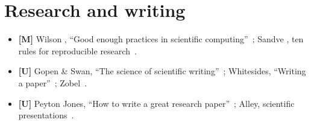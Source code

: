 \section*{Research and writing}
\begin{itemize}
  \item \textbf{[M]} Wilson \etal, \enquote{Good enough practices in scientific
        computing}~\cite{ch12-13:wilson2017goodenough}; Sandve \etal, ten rules
        for reproducible research~\cite{ch12-13:sandve2013tenrules}.
  \item \textbf{[U]} Gopen \& Swan, \enquote{The science of scientific
        writing}~\cite{ch12-13:gopen1990science}; Whitesides, \enquote{Writing a
        paper}~\cite{ch12-13:whitesides2004writing}; Zobel~\cite{ch12-13:zobel2014writing}.
  \item \textbf{[U]} Peyton Jones, \enquote{How to write a great research
        paper}~\cite{ch12-13:peytonjones2010paper}; Alley, scientific
        presentations~\cite{ch12-13:alley2013craft}.
\end{itemize}
